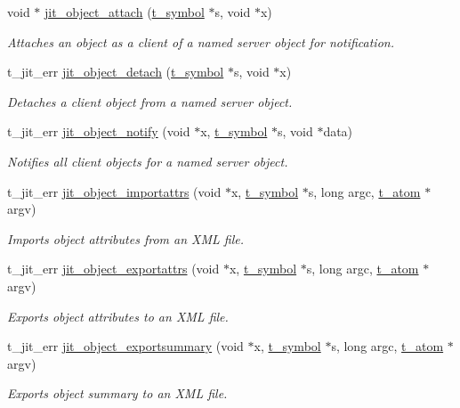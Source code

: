 \begin{DoxyCompactItemize}
void $\ast$ \hyperlink{group__objectmod_ga213166e8beeb29aca36c57cd07c722f1}{jit\_\-object\_\-attach} (\hyperlink{structt__symbol}{t\_\-symbol} $\ast$s, void $\ast$x)
\begin{DoxyCompactList}\small\item\em Attaches an object as a client of a named server object for notification. \item\end{DoxyCompactList}\item 
t\_\-jit\_\-err \hyperlink{group__objectmod_gaa286218b643371fe28cbe261facd5b21}{jit\_\-object\_\-detach} (\hyperlink{structt__symbol}{t\_\-symbol} $\ast$s, void $\ast$x)
\begin{DoxyCompactList}\small\item\em Detaches a client object from a named server object. \item\end{DoxyCompactList}\item 
t\_\-jit\_\-err \hyperlink{group__objectmod_ga4bbd50b2d1e34de44d36e1a66a477b9f}{jit\_\-object\_\-notify} (void $\ast$x, \hyperlink{structt__symbol}{t\_\-symbol} $\ast$s, void $\ast$data)
\begin{DoxyCompactList}\small\item\em Notifies all client objects for a named server object. \item\end{DoxyCompactList}\item 
t\_\-jit\_\-err \hyperlink{group__objectmod_ga29a1be851f1e88aa459689681d8b996e}{jit\_\-object\_\-importattrs} (void $\ast$x, \hyperlink{structt__symbol}{t\_\-symbol} $\ast$s, long argc, \hyperlink{structt__atom}{t\_\-atom} $\ast$argv)
\begin{DoxyCompactList}\small\item\em Imports object attributes from an XML file. \item\end{DoxyCompactList}\item 
t\_\-jit\_\-err \hyperlink{group__objectmod_ga62d196313913e245d4baa69ed2308f01}{jit\_\-object\_\-exportattrs} (void $\ast$x, \hyperlink{structt__symbol}{t\_\-symbol} $\ast$s, long argc, \hyperlink{structt__atom}{t\_\-atom} $\ast$argv)
\begin{DoxyCompactList}\small\item\em Exports object attributes to an XML file. \item\end{DoxyCompactList}\item 
t\_\-jit\_\-err \hyperlink{group__objectmod_ga9be3b8c2e695b471dee3e9242691c472}{jit\_\-object\_\-exportsummary} (void $\ast$x, \hyperlink{structt__symbol}{t\_\-symbol} $\ast$s, long argc, \hyperlink{structt__atom}{t\_\-atom} $\ast$argv)
\begin{DoxyCompactList}\small\item\em Exports object summary to an XML file. \item\end{DoxyCompactList}\end{DoxyCompactItemize}


